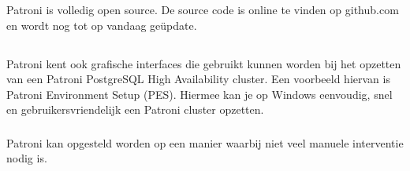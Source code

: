 Patroni is volledig open source. De source code is online te vinden op github.com en wordt nog tot op vandaag geüpdate.

\subsection{}
\label{subsec:Could have}





\subsubsection{}
\label{subsubsec:Grafische interface}

Patroni kent ook grafische interfaces die gebruikt kunnen worden bij het opzetten van een Patroni PostgreSQL High Availability cluster. Een voorbeeld hiervan is Patroni Environment Setup (PES). Hiermee kan je op Windows eenvoudig, snel en gebruikersvriendelijk een Patroni cluster opzetten.


\subsubsection{}
\label{subsubsec:Beperkte manuele interventie}

Patroni kan opgesteld worden op een manier waarbij niet veel manuele interventie nodig is.
